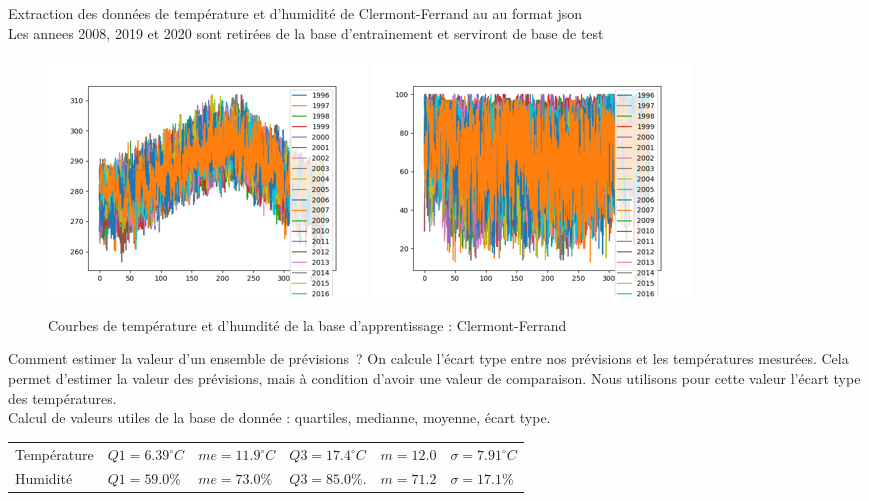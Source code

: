 \documentclass[11pt,a4paper]{article}
\begin{document}
Extraction des données de température et d'humidité de Clermont-Ferrand au au format json \\
Les annees 2008, 2019 et 2020 sont retirées de la base d'entrainement et serviront de base de test\\
\begin{figure} [!h]
\centering
\includegraphics[width=0.48 \textwidth]{./imagesTIPE/temperature.png}\quad
\includegraphics[width=0.48 \textwidth]{./imagesTIPE/humidite.png}
\caption{\label{fig:190101Lolita} Courbes de température et d'humdité de la base d'apprentissage : Clermont-Ferrand}
\end{figure}

Comment estimer la valeur d'un ensemble de prévisions~? On calcule l'écart type entre nos prévisions et les températures mesurées. Cela permet d'estimer la valeur des prévisions, mais à condition d'avoir une valeur de comparaison. Nous utilisons pour cette valeur l'écart type des températures.
 \\ Calcul de valeurs utiles de la base de donnée : quartiles, medianne, moyenne, écart type.\\ 
\begin{tabular}{llllll}\hline\hline
Température& $Q1 = 6.39{}^{\circ}C$ &$ me = 11.9 {}^{\circ}C$ & $Q3 = 17.4{}^{\circ}C $&$ m= 12.0 $ & $\sigma = 7.91 {}^{\circ}C$ \\
Humidité    &   $ Q1 = 59.0\%$           &$  me = 73.0\%  $           & $Q3 = 85.0\%.           $& $ m=71.2  $ & $\sigma = 17.1 \% $ \\
\hline 
\end{tabular} 
\end{document}
